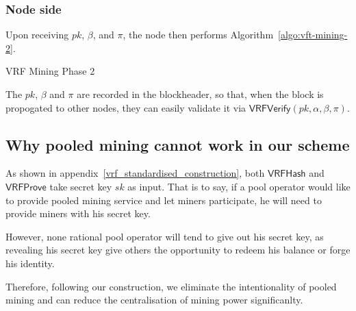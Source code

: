 \subsubsection{Node side\\}

Upon receiving $pk$, $\beta$, and $\pi$, the node then performs Algorithm~\ref{algo:vft-mining-2}.

\begin{algorithm}[H]
\caption{VRF Mining Phase 2}
\label{algo:vft-mining-2}
\SetAlgoLined
{}
\end{algorithm}

The $pk$, $\beta$ and $\pi$ are recorded in the blockheader, so that, when the block is propogated to other nodes, they can easily validate it via $\mathsf{VRFVerify}(pk, \alpha, \beta, \pi)$.



\subsection{Why pooled mining cannot work in our scheme}
\label{sec:discourage-pool}

As shown in appendix~\ref{vrf_standardised_construction}, both $\mathsf{VRFHash}$ and $\mathsf{VRFProve}$ take secret key $sk$ as input.
That is to say, if a pool operator would like to provide pooled mining service and let miners participate, he will need to provide miners with his secret key.

However, none rational pool operator will tend to give out his secret key, as revealing his secret key give others the opportunity to redeem his balance or forge his identity.

Therefore, following our construction, we eliminate the intentionality of pooled mining and can reduce the centralisation of mining power significanlty.

